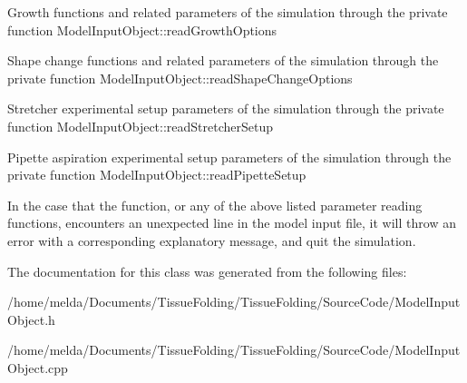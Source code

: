 Growth functions and related parameters of the simulation through the private function Model\+Input\+Object\+::read\+Growth\+Options

Shape change functions and related parameters of the simulation through the private function Model\+Input\+Object\+::read\+Shape\+Change\+Options

Stretcher experimental setup parameters of the simulation through the private function Model\+Input\+Object\+::read\+Stretcher\+Setup

Pipette aspiration experimental setup parameters of the simulation through the private function Model\+Input\+Object\+::read\+Pipette\+Setup

In the case that the function, or any of the above listed parameter reading functions, encounters an unexpected line in the model input file, it will throw an error with a corresponding explanatory message, and quit the simulation.

The documentation for this class was generated from the following files\+:\begin{DoxyCompactItemize}
\item 
/home/melda/\+Documents/\+Tissue\+Folding/\+Tissue\+Folding/\+Source\+Code/Model\+Input\+Object.\+h\item 
/home/melda/\+Documents/\+Tissue\+Folding/\+Tissue\+Folding/\+Source\+Code/Model\+Input\+Object.\+cpp\end{DoxyCompactItemize}
